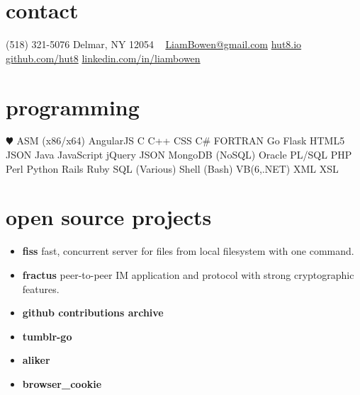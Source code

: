 \documentclass[]{friggeri-cv} %
\begin{document}


\begin{aside} %
\section{contact}
(518) 321-5076
Delmar, NY 12054
~
\href{mailto:LiamBowen@gmail.com}{LiamBowen@gmail.com}
\href{http://hut8.io}{hut8.io}
\href{https://github.com/hut8}{github.com/hut8}
\href{https://linkedin.com/in/liambowen}{linkedin.com/in/liambowen}
~
\section{programming}
{\color{red} $\varheartsuit$}
ASM (x86/x64)
AngularJS
C
C++
CSS
C\#
FORTRAN
Go
Flask
HTML5
JSON
Java
JavaScript
jQuery
JSON
MongoDB (NoSQL)
Oracle PL/SQL
PHP
Perl
Python
Rails
Ruby
SQL (Various)
Shell (Bash)
VB(6,.NET)
XML
XSL
\end{aside}


\section{open source projects}

\begin{itemize}
\item \textbf{fiss} fast, concurrent server for files from local filesystem with one command.
\item \textbf{fractus} peer-to-peer IM application and protocol with strong cryptographic features.
\item \textbf{github contributions archive}
\item \textbf{tumblr-go}
\item \textbf{aliker}
\item \textbf{browser\_cookie}
\end{itemize}

\end{document}
